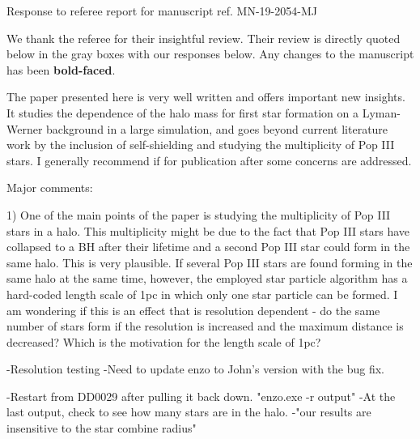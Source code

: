 \documentclass[11pt]{article}
\newenvironment{referee}[1][]{%
    \ignorespaces%
    \begin{mdframed}[style=myquotestyle,#1]%
}{%
    \end{mdframed}%
    \ignorespacesafterend%
}%
\begin{document}
\begin{center} 
\bfseries{
\begin{large}
  Response to referee report for manuscript ref. MN-19-2054-MJ
\end{large}
}
\end{center}

We thank the referee for their insightful review.  Their review is directly quoted below in the gray boxes with our responses below.  Any changes to the manuscript has been \textbf{bold-faced}.

\begin{referee}
The paper presented here is very well written and offers important new insights.  It studies the dependence of the halo mass for first star formation on a Lyman-Werner background in a large simulation, and goes beyond current literature work by the inclusion of self-shielding and studying the multiplicity of Pop III stars. I generally recommend if for publication after some concerns are addressed.
\end{referee}


\begin{referee}
Major comments:

1) One of the main points of the paper is studying the multiplicity of Pop III stars in a halo. This multiplicity might be due to the fact that Pop III stars have collapsed to a BH after their lifetime and a second Pop III star could form in the same halo. This is very plausible. If several Pop III stars are found forming in the same halo at the same time, however, the employed star particle algorithm has a hard-coded length scale of 1pc in which only one star particle can be formed. I am wondering if this is an effect that is resolution dependent - do the same number of stars form if the resolution is increased and the maximum distance is decreased? Which is the motivation for the length scale of 1pc?
\end{referee}

-Resolution testing
-Need to update enzo to John's version with the bug fix. 

-Restart from DD0029 after pulling it back down. "enzo.exe -r output"
-At the last output, check to see how many stars are in the halo. 
-"our results are insensitive to the star combine radius"
\end{document}
